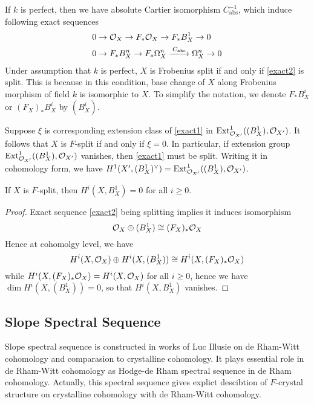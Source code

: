 \documentclass[11pt,a4paper]{scmsnotes}
\begin{document}
If $k$ is perfect, then we have absolute Cartier isomorphism $C^{-1}_{\text{abs}}$, which induce following exact sequences
\begin{align}
\label{exact2}&0 \to \sheaf{X} \to F_*\sheaf{X} \to F_*B_X^1 \to 0\\
&0 \to F_* B_X^n \to F_*\Omega^n_X \xlongrightarrow{C_{\text{abs}}} \Omega^n_{X} \to 0
\end{align}
Under assumption that $k$ is perfect, $X$ is Frobenius split if and only if \ref{exact2} is split. This is because in this condition, base change of $X$ along Frobenius morphism of field $k$ is isomorphic to $X$.
To simplify the notation, we denote $F_*B_X^i$ or $(F_X)_* B_X^i$ by $(B_X^i)$.

Suppose $\xi$ is corresponding extension class of \ref{exact1} in $\operatorname{Ext}^1_{\mathcal{O}_{X'}}((B_X^1), \mathcal{O}_{X'})$. It follows that $X$ is $F$-split if and only if $\xi =0 $. In particular, if extension group $\operatorname{Ext}^1_{\mathcal{O}_{X'}}((B_X^1), \mathcal{O}_{X'})$ vanishes, then \ref{exact1} must be split. Writing it in cohomology form, we have $H^1(X', (B_X^1)^{\vee}) = \operatorname{Ext}^1_{\mathcal{O}_{X'}}((B_X^1), \mathcal{O}_{X'})$.

\begin{seclemma}\label{lemma1}
	If $X$ is $F$-split, then $H^i(X,B_X^1)=0$ for all $i\geq0$.
\end{seclemma}
\begin{proof}
	Exact sequence \ref{exact2} being splitting implies it induces isomorphism 
	\[
	\mathcal{O}_{X} \oplus (B_X^1) \cong (F_X)_*\mathcal{O}_{X}
	\]
	Hence at cohomolgy level, we have 
	\begin{equation}
		H^i(X,\mathcal{O}_{X}) \oplus H^i(X,(B_X^1)) \cong H^i(X,(F_X)_* \mathcal{O}_{X})
	\end{equation}
	while $H^i(X,(F_X)_* \mathcal{O}_{X}) = H^i(X, \mathcal{O}_{X})$ for all $i\geq 0$, hence we have $\dim H^i(X,(B_X^1))=0$, so that $H^i(X,B_X^1)$ vanishes.
\end{proof}
\subsection{Slope Spectral Sequence}
Slope spectral sequence is constructed in works \cite{} of Luc Illusie on de Rham-Witt cohomology and comparasion to crystalline cohomology. It plays essential role in de Rham-Witt cohomology as Hodge-de Rham spectral sequence in de Rham cohomology. Actually, this spectral sequence gives explict descibtion of $F$-crystal structure on crystalline cohomology with de Rham-Witt cohomology. 
\end{document}
